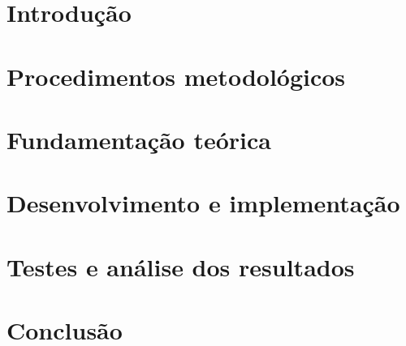 \documentclass[
	11pt,				%
	openright,			%
	oneside,			%
	a4paper,			%
	english,			%
	french,				%
	spanish,			%
	brazil,				%
	]{abntex2}
\begin{document}
%

\tableofcontents*
\cleardoublepage



\textual

\chapter[Introdução]{Introdução}


\chapter{Procedimentos metodológicos}


\chapter{Fundamentação teórica}

%
\chapter{Desenvolvimento e implementação}


\chapter{Testes e análise dos resultados}




% 

\chapter[Conclusão]{Conclusão}

\end{document}
